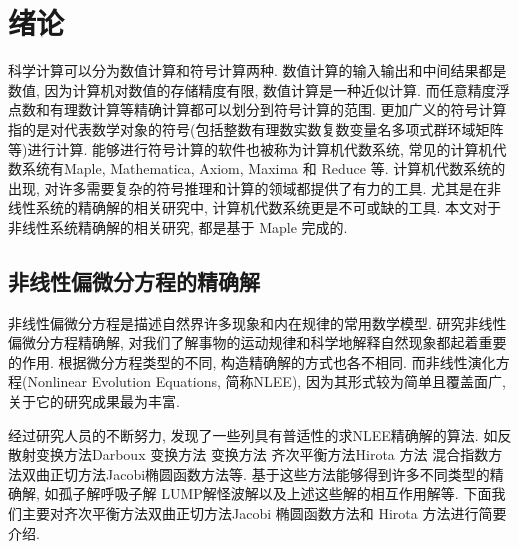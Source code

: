 \chapter{绪论} 
科学计算可以分为数值计算和符号计算两种. 数值计算的输入输出和中间结果都是数值, 因为计算机对数值的存储精度有限, 数值计算是一种近似计算. 而任意精度浮点数和有理数计算等精确计算都可以划分到符号计算的范围. 更加广义的符号计算指的是对代表数学对象的符号(包括整数\D 有理数\D 实数\D 复数\D 变量名\D 多项式\D 群\D 环\D 域\D 矩阵等)进行计算. 能够进行符号计算的软件也被称为计算机代数系统, 常见的计算机代数系统有Maple, Mathematica, Axiom, Maxima 和 Reduce 等. 计算机代数系统的出现, 对许多需要复杂的符号推理和计算的领域都提供了有力的工具. 尤其是在非线性系统的精确解的相关研究中, 计算机代数系统更是不可或缺的工具. 本文对于非线性系统精确解的相关研究, 都是基于 Maple 完成的. 

\section{非线性偏微分方程的精确解}
非线性偏微分方程是描述自然界许多现象和内在规律的常用数学模型. 研究非线性偏微分方程精确解, 对我们了解事物的运动规律和科学地解释自然现象都起着重要的作用. 根据微分方程类型的不同, 构造精确解的方式也各不相同. 而非线性演化方程(Nonlinear Evolution Equations, 简称NLEE), 因为其形式较为简单且覆盖面广, 关于它的研究成果最为丰富. 

经过研究人员的不断努力, 发现了一些列具有普适性的求NLEE精确解的算法. 如反散射变换方法\cite{kawata1978inverse,ma2014verifying}\D Darboux 变换方法 \cite{matveev1991darboux,ling2018general,lou1997non}\D \Backlund{}变换方法 \cite{wahlquist1973backlund,li2008method,cheng2015multiple}\D 齐次平衡方法\cite{zhibin1993travelling,wang1995solitary,wang1996application,hbm1998,hbm1998b,hbm1999,senthilvelan2001extended,zhao2002new,feng2004comment,nguyen2015modified,rady2010homogeneous,eslami2014exact}\D Hirota 方法 \cite{hirota1971exact,hereman1991exact,hu2002application,hirota2003vector,ma2015lump}\D 混合指数方法\cite{hereman1986exact}\D 双曲正切方法\cite{huang1989exact,malfliet1992solitary,li_book_2007,parkes1996automated,liu2001master,li2002rath,fan2000extended,yan2001new,zheng2003generalized}\D Jacobi椭圆函数方法\cite{liu2001jacobi,zhang2003jacobi,zhou2003periodic,yin2002automated,yin2003automated,li2004raeem,chen2003improved,wang2005new,gui2005applications,chao2005symbolic}等. 基于这些方法能够得到许多不同类型的精确解, 如孤子解\cite{hirota1971exact,makhankov1980computer}\D 呼吸子解 \cite{tajiri1989breather,guo2011rogue,sun2018general}\D LUMP解\cite{satsuma1979two,villarroel1999discrete,imai1997dromion}\D 怪波解\cite{guo2011rogue,zhang2014rogue,sun2018general,zhaqilao2018symbolic}以及上述这些解的相互作用解等. 下面我们主要对齐次平衡方法\D 双曲正切方法\D Jacobi 椭圆函数方法和 Hirota 方法进行简要介绍. 

